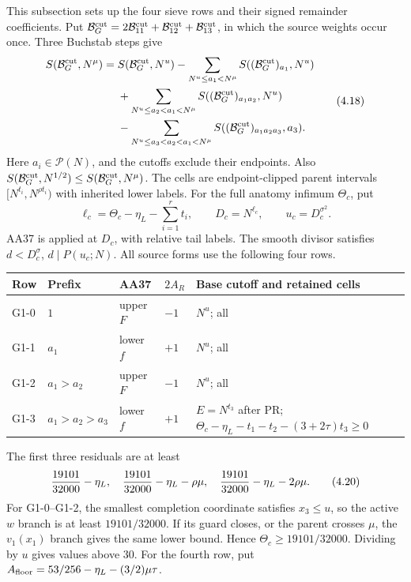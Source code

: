 This subsection sets up the four sieve rows and their signed remainder coefficients.
Put $\mathcal B_G^{\rm cut}=2\mathcal B_{11}^{\rm cut}
+\mathcal B_{12}^{\rm cut}+\mathcal B_{13}^{\rm cut}$, in which the source weights occur once.
Three Buchstab steps give
\[
\begin{aligned}
 S(\mathcal B_G^{\rm cut},N^\mu)
 ={}&S(\mathcal B_G^{\rm cut},N^u)
 -\sum_{N^u\le a_1<N^\mu}S((\mathcal B_G^{\rm cut})_{a_1},N^u)\\
 &+\sum_{N^u\le a_2<a_1<N^\mu}
                   S((\mathcal B_G^{\rm cut})_{a_1a_2},N^u)\\
 &-\sum_{N^u\le a_3<a_2<a_1<N^\mu}
                   S((\mathcal B_G^{\rm cut})_{a_1a_2a_3},a_3).
\end{aligned}
 \tag{4.18}
\]
Here $a_i\in\mathcal P(N)$, and the cutoffs exclude their endpoints.
Also $S(\mathcal B_G^{\rm cut},N^{1/2})\le S(\mathcal B_G^{\rm cut},N^\mu)$.
The cells are endpoint-clipped parent intervals $[N^{t_i},N^{\rho t_i})$ with inherited lower labels.
For the full anatomy infimum $\Theta_c$, put
\[
 \ell_c=\Theta_c-\eta_L-\sum_{i=1}^rt_i,\qquad
 D_c=N^{\ell_c},\qquad u_c=D_c^{\sigma^2}.
 \tag{4.19}
\]
AA37 is applied at $D_c$, with relative tail labels.
The smooth divisor satisfies $d<D_c^\sigma$, $d\mid P(u_c;N)$.
All source forms use the following four rows.
\begingroup
\setlength{\tabcolsep}{3pt}
\begin{longtable}{@{}llllp{}@{}}
\toprule
Row & Prefix & AA37 & $2A_R$ & Base cutoff and retained cells \\
\midrule
G1-0 & $1$ & upper $F$ & $-1$ & $N^u$; all \\
G1-1 & $a_1$ & lower $f$ & $+1$ & $N^u$; all \\
G1-2 & $a_1>a_2$ & upper $F$ & $-1$ & $N^u$; all \\
G1-3 & $a_1>a_2>a_3$ & lower $f$ & $+1$ & $E=N^{t_3}$ after PR; $\Theta_c-\eta_L-t_1-t_2-(3+2\tau)t_3\ge0$ \\
\bottomrule
\end{longtable}
\endgroup
The first three residuals are at least
\[
 {19101\over32000}-\eta_L,\quad
 {19101\over32000}-\eta_L-\rho\mu,\quad
 {19101\over32000}-\eta_L-2\rho\mu.
 \tag{4.20}
\]
For G1-0--G1-2, the smallest completion coordinate satisfies
$x_3\le u$, so the active $w$ branch is at least $19101/32000$.
If its guard closes, or the parent crosses $\mu$, the $v_1(x_1)$
branch gives the same lower bound. Hence
$\Theta_c\ge19101/32000$.
Dividing by $u$ gives values above 30.
For the fourth row, put
$A_{\rm floor}=53/256-\eta_L-(3/2)\mu\tau$.
